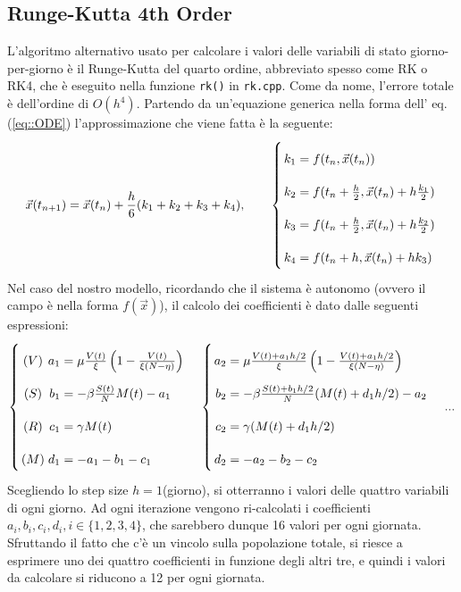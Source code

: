 \documentclass{article}
\begin{document}
\subsection{Runge-Kutta 4th Order}
L'algoritmo alternativo usato per calcolare i valori delle variabili di 
stato giorno-per-giorno è il Runge-Kutta del quarto ordine, abbreviato 
spesso come RK o RK4, che è eseguito nella funzione \verb|rk()| in 
\verb|rk.cpp|.
Come da nome, l'errore totale è dell'ordine di $O(h^4)$.
Partendo da un'equazione generica nella forma dell' eq. (\ref{eq::ODE})
l'approssimazione che viene fatta è la seguente: \\
\begin{equation} \label{eq::rk4}
    \vec{x}(t_{n+1})=\vec{x}(t_n)+\frac{h}{6}(k_1+k_2+k_3+k_4), \qquad
    \left\{ \arraycolsep=1.4pt\def\arraystretch{2.2}
    \begin{array}{rcl}
    k_1 & = & f(t_n, \vec{x}(t_n)) \\
    k_2 & = & f(t_n+\frac{h}{2}, \vec{x}(t_n)+h\frac{k_1}{2}) \\
    k_3 & = & f(t_n+\frac{h}{2}, \vec{x}(t_n)+h\frac{k_2}{2}) \\
    k_4 & = & f(t_n+h, \vec{x}(t_n)+hk_3) \\
    \end{array}\right.
\end{equation}
Nel caso del nostro modello, ricordando che il sistema è autonomo (ovvero
il campo è nella forma $f(\vec{x})$), il calcolo dei coefficienti è dato 
dalle seguenti espressioni:
\begin{equation} \label{eq::rk4Coeff}
    \left\{ \arraycolsep=1.4pt\def\arraystretch{2.2}
    \begin{array}{crcl}
    (V) & a_1 & = & \mu \frac{V(t)}{\xi}\left(1-\frac{V(t)}
    {\xi(N-\eta)}\right) \\
    (S) & b_1 & = &  -\beta\frac{S(t)}{N}M(t)-a_1\\
    (R) & c_1 & = &  \gamma M(t)\\
    (M) & d_1 & = &  -a_1-b_1-c_1 \\
    \end{array}\right. \quad
    \left\{ \arraycolsep=1.4pt\def\arraystretch{2.2}
    \begin{array}{rcl}
    a_2 & = & \mu \frac{V(t) + a_1 h/2}{\xi}\left(1-\frac{V(t)+
    a_1 h/2}{\xi(N-\eta)}\right) \\
    b_2 & = &  -\beta\frac{S(t)+b_1 h/2}{N}(M(t)+d_1 h/2)-a_2\\
    c_2 & = &  \gamma (M(t)+d_1 h/2)\\
    d_2 & = &  -a_2-b_2-c_2 \\
    \end{array}\right. \quad ...
\end{equation}
Scegliendo lo step size $h=1$(giorno), si otterranno i valori delle 
quattro variabili di ogni giorno. Ad ogni iterazione vengono ri-calcolati
i coefficienti $a_i, b_i, c_i,d_i, i \in \{1,2,3,4\}$, che sarebbero dunque
16 valori per ogni giornata. Sfruttando il fatto che c'è un vincolo sulla
popolazione totale, si riesce a esprimere uno dei quattro coefficienti 
in funzione degli altri  tre, e quindi i valori da calcolare si riducono 
a 12 per ogni giornata.\\
\end{document}
